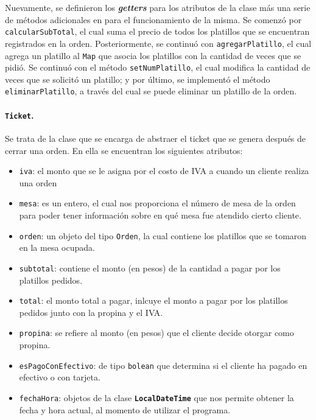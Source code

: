 Nuevamente, se definieron los \textit{\textbf{getters}} para los atributos de la clase 
más una serie de métodos adicionales en para el funcionamiento de la misma. Se comenzó por 
\texttt{calcularSubTotal}, el cual suma el precio de todos los platillos que se encuentran 
registrados en la orden. Posteriormente, se continuó con \texttt{agregarPlatillo}, el cual
agrega un platillo al \texttt{Map} que asocia los platillos con la cantidad de veces que 
se pidió. Se continuó con el método \texttt{setNumPlatillo}, el cual modifica la cantidad 
de veces que se solicitó un platillo; y por último, se implementó el método 
\texttt{eliminarPlatillo}, a través del cual se puede eliminar un platillo de la orden.

\paragraph{\texttt{Ticket}.} Se trata de la clase que se encarga de abstraer el 
ticket que se genera después de cerrar una orden. En ella se encuentran los siguientes
atributos:
\begin{itemize}
  \item \texttt{iva}: el monto que se le asigna por el costo de IVA a cuando un cliente realiza 
  una orden 
  \item \texttt{mesa}: es un entero, el cual nos proporciona el número de mesa de la orden para poder 
  tener información sobre en qué mesa fue atendido cierto cliente. 
  \item \texttt{orden}: un objeto del tipo \texttt{Orden}, la cual contiene los platillos 
  que se tomaron en la mesa ocupada. 
  \item \texttt{subtotal}: contiene el monto (en pesos) de la cantidad a pagar por los platillos 
  pedidos. 
  \item \texttt{total}: el monto total a pagar, inlcuye el monto a pagar por los platillos pedidos junto con la 
  propina y el IVA. 
  \item \texttt{propina}: se refiere al monto (en pesos) que el cliente decide otorgar como propina.
  \item \texttt{esPagoConEfectivo}: de tipo \texttt{bolean} que determina si el cliente ha pagado en 
  efectivo o con tarjeta. 
  \item \texttt{fechaHora}: objetos de la clase \texttt{\textbf{LocalDateTime}} que nos permite 
  obtener la fecha y hora actual, al momento de utilizar el programa. 
\end{itemize}

\pagebreak
